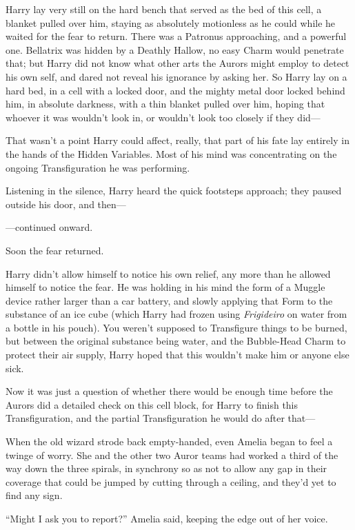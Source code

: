Harry lay very still on the hard bench that served as the bed of this cell, a blanket pulled over him, staying as absolutely motionless as he could while he waited for the fear to return. There was a Patronus approaching, and a powerful one. Bellatrix was hidden by a Deathly Hallow, no easy Charm would penetrate that; but Harry did not know what other arts the Aurors might employ to detect his own self, and dared not reveal his ignorance by asking her. So Harry lay on a hard bed, in a cell with a locked door, and the mighty metal door locked behind him, in absolute darkness, with a thin blanket pulled over him, hoping that whoever it was wouldn’t look in, or wouldn’t look too closely if they did—

That wasn’t a point Harry could affect, really, that part of his fate lay entirely in the hands of the Hidden Variables. Most of his mind was concentrating on the ongoing Transfiguration he was performing.

Listening in the silence, Harry heard the quick footsteps approach; they paused outside his door, and then—

—continued onward.

Soon the fear returned.

Harry didn’t allow himself to notice his own relief, any more than he allowed himself to notice the fear. He was holding in his mind the form of a Muggle device rather larger than a car battery, and slowly applying that Form to the substance of an ice cube (which Harry had frozen using \emph{Frigideiro} on water from a bottle in his pouch). You weren’t supposed to Transfigure things to be burned, but between the original substance being water, and the Bubble-Head Charm to protect their air supply, Harry hoped that this wouldn’t make him or anyone else sick.

Now it was just a question of whether there would be enough time before the Aurors did a detailed check on this cell block, for Harry to finish this Transfiguration, and the partial Transfiguration he would do after that—

\later

When the old wizard strode back empty-handed, even Amelia began to feel a twinge of worry. She and the other two Auror teams had worked a third of the way down the three spirals, in synchrony so as not to allow any gap in their coverage that could be jumped by cutting through a ceiling, and they’d yet to find any sign.

“Might I ask you to report?” Amelia said, keeping the edge out of her voice.

